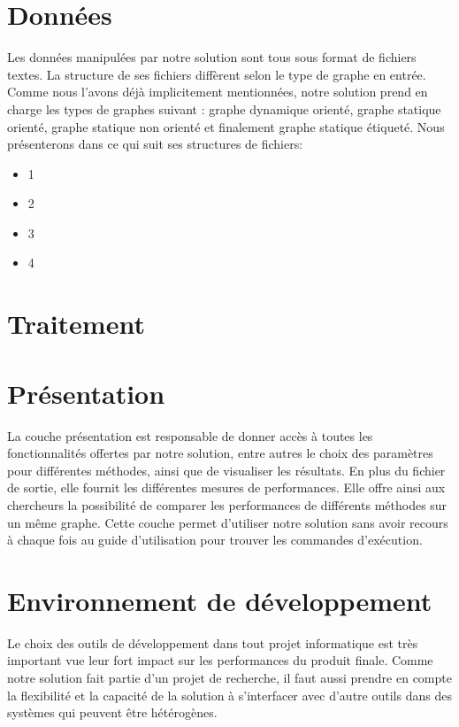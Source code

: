 \documentclass[a4paper,oneside,12pt]{report}
\theoremstyle{definition}
\begin{document}
	
	
	\section{Données}
	Les données manipulées par notre solution sont tous sous format de fichiers textes. La structure de ses fichiers diffèrent selon le type de graphe en entrée. Comme nous l'avons déjà implicitement mentionnées, notre solution prend en charge les types de graphes suivant : graphe dynamique orienté, graphe statique orienté, graphe statique non orienté et finalement graphe statique étiqueté. Nous présenterons dans ce qui suit ses structures de fichiers:
	
	\begin{itemize}[label=$\bullet$]
	\item 1
	\item 2
	\item 3
	\item 4
	
	\end{itemize}
	
	
	
	\section{Traitement}
	\section{Présentation}
	
	La couche présentation est responsable de donner accès à toutes les fonctionnalités offertes par notre solution, entre autres le choix des paramètres pour différentes méthodes, ainsi que de visualiser les résultats. En plus du fichier de sortie, elle fournit les différentes mesures de performances. Elle offre ainsi aux chercheurs la possibilité de comparer les performances de différents méthodes sur un même graphe. Cette couche permet d'utiliser notre solution sans avoir recours à chaque fois au guide d'utilisation pour trouver les commandes d'exécution.
	
	\section{Environnement de développement}
		
		Le choix des outils de développement dans tout projet informatique est très important vue leur fort impact sur les performances du produit finale. Comme notre solution fait partie d'un projet de recherche, il faut aussi prendre en compte la flexibilité et la capacité de la solution à s'interfacer avec d'autre outils dans des systèmes qui peuvent être hétérogènes. 
		
\end{document}
